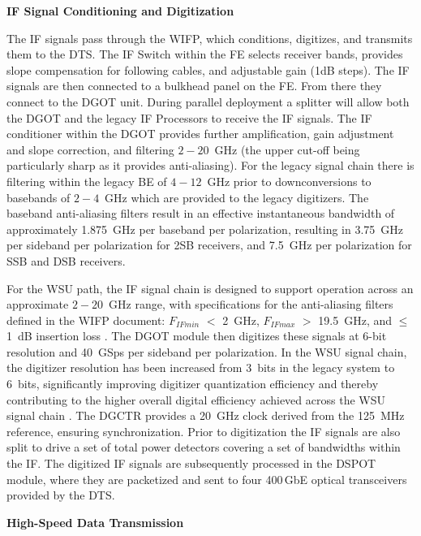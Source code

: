 \noindent
\textbf{IF Signal Conditioning and Digitization}

The \ac{IF} signals pass through the \ac{WIFP}, which conditions, digitizes, and transmits them to the \ac{DTS}.
The IF Switch within the FE selects receiver bands, provides slope compensation for following cables, and adjustable gain (1dB steps). The IF signals are then connected to a bulkhead panel on the FE. From there they connect to the \ac{DGOT} unit. During parallel deployment a splitter will allow both the DGOT and the legacy IF Processors to receive the IF signals. The IF conditioner within the DGOT provides further amplification, gain adjustment and slope correction, and filtering $2-20$~GHz (the upper cut-off being particularly sharp as it provides anti-aliasing). 
For the legacy signal chain there is filtering within the legacy BE of $4-12$~GHz prior to downconversions to basebands of $2-4$~GHz which are provided to the legacy digitizers. The baseband anti-aliasing filters result in an effective instantaneous bandwidth of approximately 1.875~GHz per baseband per polarization, resulting in 3.75~GHz per sideband per polarization for \ac{2SB} receivers, and 7.5~GHz per polarization for \ac{SSB} and \ac{DSB} receivers.

For the \ac{WSU} path, the \ac{IF} signal chain is designed to support operation across an approximate $2-20$~GHz range, with specifications for the anti-aliasing filters defined in the \ac{WIFP} document: $F_{IFmin}$ $<$ 2~GHz, $F_{IFmax}$ $>$ 19.5~GHz, and $\le$1~dB insertion loss \cite{WIFPDescription}.
The \ac{DGOT} module then digitizes these signals at 6-bit resolution and 40~GSps per sideband per polarization.
In the \ac{WSU} signal chain, the digitizer resolution has been increased from 3~bits in the legacy system to 6~bits, significantly improving digitizer quantization efficiency and thereby contributing to the higher overall digital efficiency achieved across the \ac{WSU} signal chain \cite{orig_dig_ef_budget}.
The \ac{DGCTR} provides a 20~GHz clock derived from the 125~MHz reference, ensuring synchronization. 
Prior to digitization the IF signals are also split to drive a set of total power detectors covering a set of bandwidths within the IF.
The digitized \ac{IF} signals are subsequently processed in the \ac{DSPOT} module, where they are packetized and sent to four 400\,GbE optical transceivers provided by the \ac{DTS}.

\noindent
\textbf{High-Speed Data Transmission}

